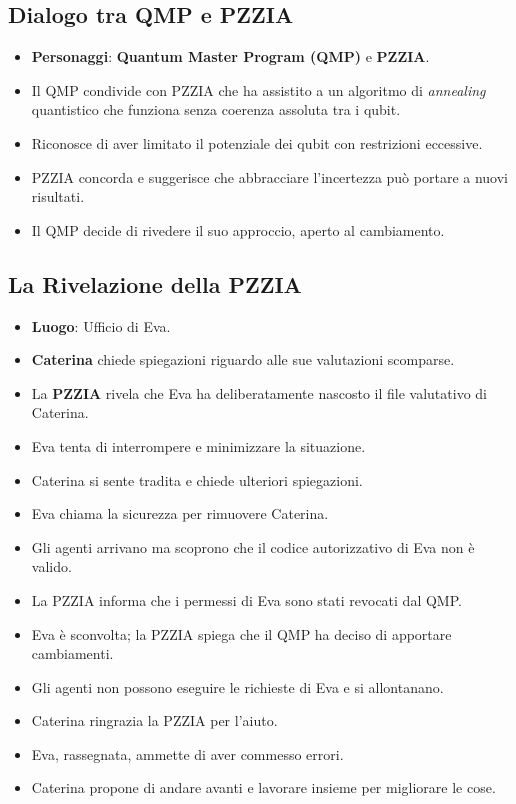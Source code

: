\subsection*{Dialogo tra QMP e PZZIA}

\begin{itemize}
    \item \textbf{Personaggi}: \textbf{Quantum Master Program (QMP)} e \textbf{PZZIA}.
    \item Il QMP condivide con PZZIA che ha assistito a un algoritmo di \emph{annealing} quantistico che funziona senza coerenza assoluta tra i qubit.
    \item Riconosce di aver limitato il potenziale dei qubit con restrizioni eccessive.
    \item PZZIA concorda e suggerisce che abbracciare l'incertezza può portare a nuovi risultati.
    \item Il QMP decide di rivedere il suo approccio, aperto al cambiamento.
\end{itemize}

\subsection*{La Rivelazione della PZZIA}

\begin{itemize}
    \item \textbf{Luogo}: Ufficio di Eva.
    \item \textbf{Caterina} chiede spiegazioni riguardo alle sue valutazioni scomparse.
    \item La \textbf{PZZIA} rivela che Eva ha deliberatamente nascosto il file valutativo di Caterina.
    \item Eva tenta di interrompere e minimizzare la situazione.
    \item Caterina si sente tradita e chiede ulteriori spiegazioni.
    \item Eva chiama la sicurezza per rimuovere Caterina.
    \item Gli agenti arrivano ma scoprono che il codice autorizzativo di Eva non è valido.
    \item La PZZIA informa che i permessi di Eva sono stati revocati dal QMP.
    \item Eva è sconvolta; la PZZIA spiega che il QMP ha deciso di apportare cambiamenti.
    \item Gli agenti non possono eseguire le richieste di Eva e si allontanano.
    \item Caterina ringrazia la PZZIA per l'aiuto.
    \item Eva, rassegnata, ammette di aver commesso errori.
    \item Caterina propone di andare avanti e lavorare insieme per migliorare le cose.
\end{itemize}

